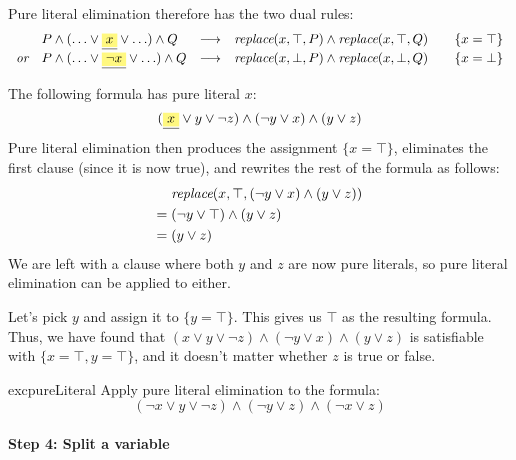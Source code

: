 Pure literal elimination therefore has the two dual rules:
%
\begin{align*}
\begin{array}{rlcll}
  & P \wedge (\ldots \vee \highlight{x} \vee \ldots) \wedge Q
  & \longrightarrow & \subst{\top}{x}{P} \wedge \subst{\top}{x}{Q}
& \quad \{x = \top\}
  \\[0.25em]
\textit{or} & P \wedge (\ldots \vee \highlight{\neg x} \vee \ldots) \wedge Q
  & \longrightarrow & \subst{\bot}{x}{P} \wedge \subst{\bot}{x}{Q}
& \quad \{x = \bot\}
\end{array}
\end{align*}
%
\begin{example}
The following formula has pure literal $x$:
%
\begin{equation*}
(\highlight{x} \vee y \vee \neg z) \wedge (\neg y \vee x)
\wedge (y \vee z)
\end{equation*}
%
Pure literal elimination then produces the assignment
$\{x = \top\}$, eliminates the first clause (since it is now true),
and rewrites the rest of the formula as follows:
%
\begin{align*}
  & \textit{replace}(x, \top, (\neg y \vee x) \wedge (y \vee z)) \\
= \; & (\neg y \vee \top) \wedge (y \vee z) \\
= \; & (y \vee z)
\end{align*}
%
We are left with a clause where both $y$ and $z$ are now pure
literals, so pure literal elimination can be applied to either.

Let's pick $y$ and assign it to $\{y = \top\}$. This gives us $\top$
as the resulting formula.  Thus, we have found that
$({x} \vee y \vee \neg z) \wedge (\neg y \vee x) \wedge (y
\vee z)$
is satisfiable with $\{x = \top, y = \top\}$, and it doesn't matter
whether $z$ is true or false.
\end{example}

\begin{restatable}{exc}{pureLiteral}
Apply pure literal elimination to the formula:
%
\begin{equation*}
(\neg x \vee y \vee \neg z) \wedge (\neg y \vee z) \wedge (\neg x \vee z)
\end{equation*}
%
\end{restatable}

\paragraph{Step 4: Split a variable}

